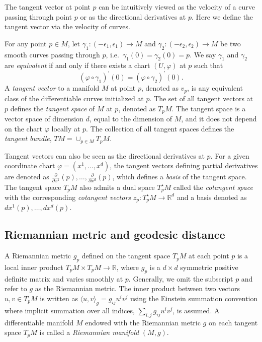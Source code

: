 \documentclass[12pt]{article}
\begin{document}
The tangent vector at point \(p\) can be intuitively viewed as the velocity of a curve passing through point \(p\) or as the directional derivatives at \(p\). Here we define the tangent vector via the velocity of curves.

For any point \(p \in M\), let \(\gamma_1: (-\epsilon_1, \epsilon_1)\rightarrow M\) and \(\gamma_2: (-\epsilon_2, \epsilon_2)\rightarrow M\) be two smooth curves passing through \(p\), i.e.~\(\gamma_1(0) = \gamma_2(0) = p\). We say \(\gamma_1\) and \(\gamma_2\) are \emph{equivalent} if and only if there exists a chart \((U,\varphi)\) at \(p\) such that
\[
(\varphi \circ \gamma_1)^\prime(0) = (\varphi \circ \gamma_2)^\prime(0).
\]
A \emph{tangent vector} to a manifold \(M\) at point \(p\), denoted as \(v_p\), is any equivalent class of the differentiable curves initialized at \(p\). The set of all tangent vectors at \(p\) defines the \emph{tangent space} of \(M\) at \(p\), denoted as \(T_pM\). The tangent space is a vector space of dimension \(d\), equal to the dimension of \(M\), and it does not depend on the chart \(\varphi\) locally at \(p\). The collection of all tangent spaces defines the \emph{tangent bundle}, \(TM = \cup_{p \in M}T_pM\).

Tangent vectors can also be seen as the directional derivatives at \(p\). For a given coordinate chart \(\varphi=(x^1,\dots,x^d)\), the tangent vectors defining partial
derivatives are denoted as \(\frac{\partial}{\partial x^1}(p),\dots,\frac{\partial}{\partial x^d}(p)\), which defines a \emph{basis} of the tangent space.
The tangent space \(T_pM\) also admits a dual space \(T^\star_pM\) called the \emph{cotangent space} with the corresponding \emph{cotangent vectors} \(z_p: T^\star_pM \rightarrow \mathbb{R}^d\) and a basis denoted as \(dx^1(p),\dots,dx^d(p)\).

\hypertarget{riemannian-metric-and-geodesic-distance}{%
\subsection{Riemannian metric and geodesic distance}\label{riemannian-metric-and-geodesic-distance}}

A Riemannian metric \(g_p\) defined on the tangent space \(T_pM\) at each point \(p\) is a local inner product \(T_pM \times T_pM \rightarrow \mathbb{R}\), where \(g_p\) is a \(d\times d\) symmetric positive definite matrix and varies smoothly at \(p\). Generally, we
omit the subscript \(p\) and refer to \(g\) as the Riemannian metric. The inner product between two vectors \(u, v \in T_pM\) is written as \(\langle u, v \rangle_g = g_{ij}u^iv^j\) using the Einstein summation convention where implicit summation over all indices, \(\sum_{i,j} g_{ij}u^iv^j\), is assumed. A differentiable manifold \(M\) endowed with the Riemannian metric \(g\) on each tangent space \(T_pM\) is called a \emph{Riemannian manifold} \((M,g)\).
\end{document}
